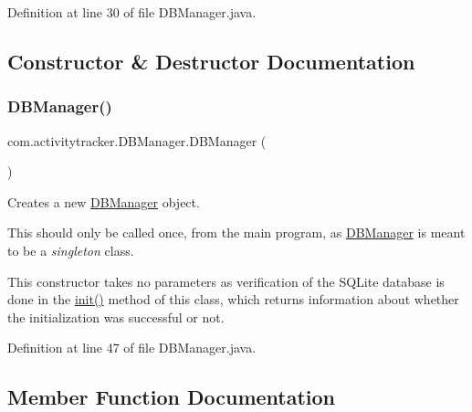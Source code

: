 Definition at line 30 of file D\+B\+Manager.\+java.



\subsection{Constructor \& Destructor Documentation}
\mbox{\label{classcom_1_1activitytracker_1_1_d_b_manager_ac1f558ef56fe02d74fe103a473a15bb5}} 
\subsubsection{\texorpdfstring{DBManager()}{DBManager()}}
{\footnotesize\ttfamily com.\+activitytracker.\+D\+B\+Manager.\+D\+B\+Manager (\begin{DoxyParamCaption}{ }\end{DoxyParamCaption})\hspace{0.3cm}{\ttfamily [package]}}

Creates a new \mbox{\hyperlink{classcom_1_1activitytracker_1_1_d_b_manager}{D\+B\+Manager}} object.

This should only be called once, from the main program, as \mbox{\hyperlink{classcom_1_1activitytracker_1_1_d_b_manager}{D\+B\+Manager}} is meant to be a {\itshape singleton} class.

This constructor takes no parameters as verification of the S\+Q\+Lite database is done in the \mbox{\hyperlink{classcom_1_1activitytracker_1_1_d_b_manager_a41df4600bb5901a26a4ea6a7108a70b9}{init()}} method of this class, which returns information about whether the initialization was successful or not. 

Definition at line 47 of file D\+B\+Manager.\+java.


\begin{DoxyCode}{0}

\end{DoxyCode}


\subsection{Member Function Documentation}
\mbox{\label{classcom_1_1activitytracker_1_1_d_b_manager_ac390a33d3547306b250c8a9ed370997c}} 
